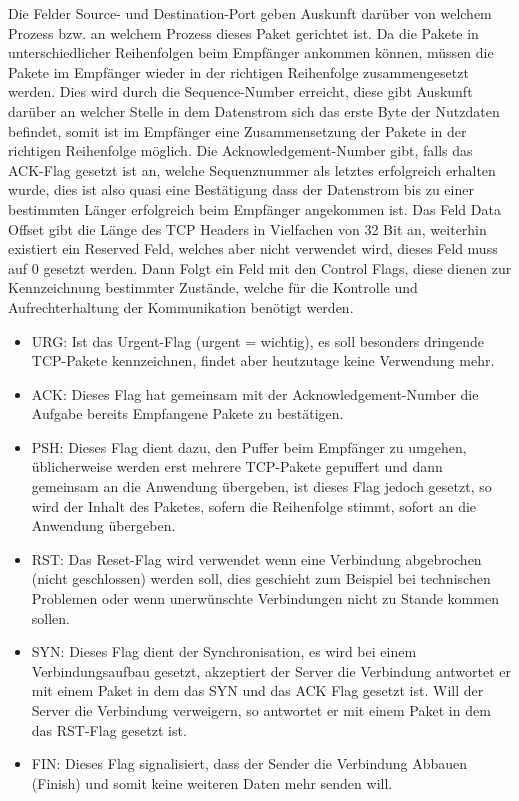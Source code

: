 \documentclass[a4paper,14pt,headsepline]{scrartcl}
\begin{document}
Die Felder Source- und Destination-Port geben Auskunft darüber von welchem Prozess bzw. an welchem Prozess dieses Paket gerichtet ist. Da die Pakete in unterschiedlicher Reihenfolgen beim Empfänger ankommen können, müssen die Pakete im Empfänger wieder in der richtigen Reihenfolge zusammengesetzt werden. Dies wird durch die Sequence-Number erreicht, diese gibt Auskunft darüber an welcher Stelle in dem Datenstrom sich das erste Byte der Nutzdaten befindet, somit ist im Empfänger eine Zusammensetzung der Pakete in der richtigen Reihenfolge möglich. Die Acknowledgement-Number gibt, falls das ACK-Flag gesetzt ist an, welche Sequenznummer als letztes erfolgreich erhalten wurde, dies ist also quasi eine Bestätigung dass der Datenstrom bis zu einer bestimmten Länger erfolgreich beim Empfänger angekommen ist. Das Feld Data Offset gibt die Länge des TCP Headers in Vielfachen von 32 Bit an, weiterhin existiert ein Reserved Feld, welches aber nicht verwendet wird, dieses Feld muss auf 0 gesetzt werden. Dann Folgt ein Feld mit den Control Flags, diese dienen zur Kennzeichnung bestimmter Zustände, welche für die Kontrolle und Aufrechterhaltung der Kommunikation benötigt werden.

\begin{itemize}
	\item URG: Ist das Urgent-Flag (urgent = wichtig), es soll besonders dringende TCP-Pakete kennzeichnen, findet aber heutzutage keine Verwendung mehr.
	\item ACK: Dieses Flag hat gemeinsam mit der Acknowledgement-Number die Aufgabe bereits Empfangene Pakete zu bestätigen.
	\item PSH: Dieses Flag dient dazu, den Puffer beim Empfänger zu umgehen, üblicherweise werden erst mehrere TCP-Pakete gepuffert und dann gemeinsam an die Anwendung übergeben, ist dieses Flag jedoch gesetzt, so wird der Inhalt des Paketes, sofern die Reihenfolge stimmt, sofort an die Anwendung übergeben.
	\item RST: Das Reset-Flag wird verwendet wenn eine Verbindung abgebrochen (nicht geschlossen) werden soll, dies geschieht zum Beispiel bei technischen Problemen oder wenn unerwünschte Verbindungen nicht zu Stande kommen sollen.
	\item SYN: Dieses Flag dient der Synchronisation, es wird bei einem Verbindungsaufbau gesetzt, akzeptiert der Server die Verbindung antwortet er mit einem Paket in dem das SYN und das ACK Flag gesetzt ist. Will der Server die Verbindung verweigern, so antwortet er mit einem Paket in dem das RST-Flag gesetzt ist.
	\item FIN: Dieses Flag signalisiert, dass der Sender die Verbindung Abbauen (Finish) und somit keine weiteren Daten mehr senden will.
\end{itemize}
\end{document}
